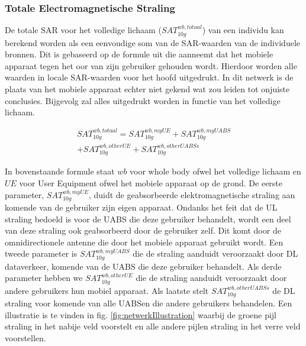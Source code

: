 \documentclass[twocolumn]{phdsymp_dutch}
\begin{document}
\subsubsection{Totale Electromagnetische Straling}
De totale \gls{SAR} voor het volledige lichaam ($SAT^{wb,totaal}_{10g}$) van een individu 
kan berekend worden als een eenvoudige som van de \gls{SAR}-waarden van de individuele bronnen. 
Dit is gebaseerd op de formule uit \cite{J17_kuehn2019modelling} die aanneemt dat het mobiele apparaat 
tegen het oor van zijn gebruiker gehouden wordt. Hierdoor worden alle waarden in locale \gls{SAR}-waarden voor het hoofd uitgedrukt.
In dit netwerk is de plaats van het mobiele apparaat echter  niet  gekend wat zou leiden tot onjuiste conclusies. Bijgevolg 
zal alles uitgedrukt worden in functie van het volledige lichaam.

\begin{equation} 
\begin{aligned}
SAT^{wb,totaal}_{10g} = SAT^{wb,myUE}_{10g} +  SAT^{wb,myUABS}_{10g} \\
+ SAT^{wb,otherUE}_{10g} + SAT^{wb,otherUABSs}_{10g}
\end{aligned}
\label{eq:overallSARwb}
\end{equation}

In bovenstaande formule staat $wb$ voor whole body ofwel het volledige lichaam en $UE$ voor User Equipment ofwel het mobiele apparaat op de grond.
De eerste parameter, $SAT^{wb,myUE}_{10g}$, duidt de geabsorbeerde elektromagnetische straling aan komende van de gebruiker zijn eigen apparaat.
Ondanks het feit dat de \gls{UL} straling bedoeld is voor de \gls{UABS} die deze gebruiker behandelt,
wordt een deel van deze straling ook geabsorbeerd door de gebruiker zelf.
Dit komt door de omnidirectionele antenne die door het mobiele apparaat gebruikt wordt.
Een tweede parameter is $SAT^{wb,myUABS}_{10g}$ die de straling aanduidt veroorzaakt door \gls{DL} dataverkeer, komende van de \gls{UABS} die deze gebruiker behandelt.
Als derde parameter hebben we $SAT^{wb,otherUE}_{10g}$ die de straling aanduidt veroorzaakt door andere gebruikers hun mobiel apparaat.
Als laatste stelt $SAT^{wb,otherUABSs}_{10g}$ de \gls{DL} straling voor komende van alle \gls{UABS}en die andere gebruikers behandelen.
Een illustratie is te vinden in fig. \ref{fig:netwerkIllustration} waarbij de groene pijl straling in het nabije veld voorstelt en alle andere 
pijlen straling in het verre veld voorstellen.
\end{document}
